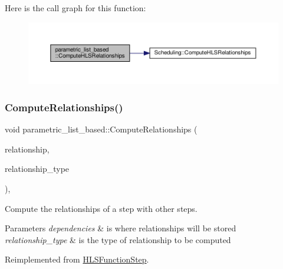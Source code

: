 Here is the call graph for this function\+:
\nopagebreak
\begin{figure}[H]
\begin{center}
\leavevmode
\includegraphics[width=350pt]{d7/d47/classparametric__list__based_a677ad6063a17ccb5313d608c4009947c_cgraph}
\end{center}
\end{figure}
\mbox{\label{classparametric__list__based_af4154cabe85bbd707fc5ee05981e54b0}} 
\subsubsection{\texorpdfstring{Compute\+Relationships()}{ComputeRelationships()}}
{\footnotesize\ttfamily void parametric\+\_\+list\+\_\+based\+::\+Compute\+Relationships (\begin{DoxyParamCaption}\item[{\hyperlink{classDesignFlowStepSet}{Design\+Flow\+Step\+Set} \&}]{relationship,  }\item[{const \hyperlink{classDesignFlowStep_a723a3baf19ff2ceb77bc13e099d0b1b7}{Design\+Flow\+Step\+::\+Relationship\+Type}}]{relationship\+\_\+type }\end{DoxyParamCaption})\hspace{0.3cm}{\ttfamily [override]}, {\ttfamily [virtual]}}



Compute the relationships of a step with other steps. 


\begin{DoxyParams}{Parameters}
{\em dependencies} & is where relationships will be stored \\
\hline
{\em relationship\+\_\+type} & is the type of relationship to be computed \\
\hline
\end{DoxyParams}


Reimplemented from \hyperlink{classHLSFunctionStep_ab3864e8dbd73b0eabc25f386a0cece54}{H\+L\+S\+Function\+Step}.



